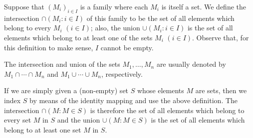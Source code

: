 Suppose that $(M_i)_{i \in I}$ is a family where each $M_i$ is itself a set. We define the intersection $\cap (M_i: i \in I)$ of this family to be the set of all elements which belong to every $M_i$ $(i \in I)$; also, the union $\cup (M_i: i \in I)$ is the set of all elements which belong to at least one of the sets $M_i$ $(i \in I)$. Observe that, for this definition to make sense, $I$ cannot be empty.

The intersection and union of the sets $M_1, \ldots, M_n$ are usually denoted by $M_1 \cap \cdots \cap M_n$ and $M_1 \cup \cdots \cup M_n$, respectively.

If we are simply given a (non-empty) set $S$ whose elements $M$ are sets, then we index $S$ by means of the identity mapping and use the above definition. The intersection $\cap (M: M \in S)$ is therefore the set of all elements which belong to every set $M$ in $S$ and the union $\cup (M: M \in S)$ is the set of all elements which belong to at least one set $M$ in $S$.
